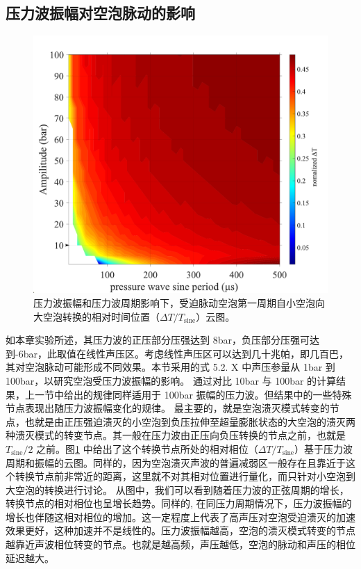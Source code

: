 \subsection{压力波振幅对空泡脉动的影响}

\begin{figure}[H]
  \centering
  \includegraphics[width=0.6\linewidth]{img/fig5.25-eps-converted-to.pdf}
  \caption{压力波振幅和压力波周期影响下，受迫脉动空泡第一周期自小空泡向大空泡转换的相对时间位置（$\Delta T/T_\mathrm{sine}$）云图。
}
  \label{fig:5.25}
\end{figure}

如本章实验所述，其压力波的正压部分压强达到
8bar，负压部分压强可达到-6bar，此取值在线性声压区。考虑线性声压区可以达到几十兆帕，即几百巴，其对空泡脉动可能形成不同效果。本节采用的式
5.2. X 中声压参量从 1bar 到 100bar，以研究空泡受压力波振幅的影响。
通过对比 10bar 与 100bar 的计算结果，上一节中给出的规律同样适用于 100bar
振幅的压力波。但结果中的一些特殊节点表现出随压力波振幅变化的规律。
最主要的，就是空泡溃灭模式转变的节点，也就是由正压强迫溃灭的小空泡到负压拉伸至超量膨胀状态的大空泡的溃灭两种溃灭模式的转变节点。其一般在压力波由正压向负压转换的节点之前，也就是
$T_\mathrm{sine}/2$ 之前。图\ref{fig:5.25} 
中给出了这个转换节点所处的相对相位（$\Delta T / T_\mathrm{sine}$）基于压力波周期和振幅的云图。同样的，因为空泡溃灭声波的普遍减弱区一般存在且靠近于这个转换节点前非常近的距离，这里就不对其相对位置进行量化，而只针对小空泡到大空泡的转换进行讨论。
从图中，我们可以看到随着压力波的正弦周期的增长，转换节点的相对相位也呈增长趋势。同样的,
在同压力周期情况下，压力波振幅的增长也伴随这相对相位的增加。这一定程度上代表了高声压对空泡受迫溃灭的加速效果更好，这种加速并不是线性的。压力波振幅越高，空泡的溃灭模式转变的节点越靠近声波相位转变的节点。也就是越高频，声压越低，空泡的脉动和声压的相位延迟越大。




